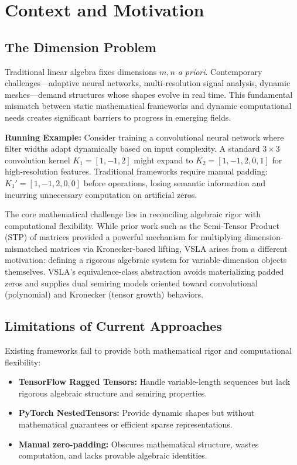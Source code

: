 \section{Context and Motivation}
\subsection{The Dimension Problem}
Traditional linear algebra fixes dimensions \(m,n\) \emph{a priori}.  Contemporary challenges—adaptive neural networks, multi‑resolution signal analysis, dynamic meshes—demand structures whose shapes evolve in real time. This fundamental mismatch between static mathematical frameworks and dynamic computational needs creates significant barriers to progress in emerging fields.

\vspace{0.5em}
\textbf{Running Example:} Consider training a convolutional neural network where filter widths adapt dynamically based on input complexity. A standard $3 \times 3$ convolution kernel $K_1 = [1, -1, 2]$ might expand to $K_2 = [1, -1, 2, 0, 1]$ for high-resolution features. Traditional frameworks require manual padding: $K_1' = [1, -1, 2, 0, 0]$ before operations, losing semantic information and incurring unnecessary computation on artificial zeros.

The core mathematical challenge lies in reconciling algebraic rigor with computational flexibility. While prior work such as the Semi-Tensor Product (STP) of matrices \cite{Cheng2001} provided a powerful mechanism for multiplying dimension-mismatched matrices via Kronecker-based lifting, VSLA arises from a different motivation: defining a rigorous algebraic system for variable-dimension objects themselves. VSLA's equivalence-class abstraction avoids materializing padded zeros and supplies dual semiring models oriented toward convolutional (polynomial) and Kronecker (tensor growth) behaviors.

\subsection{Limitations of Current Approaches}
\label{sec:limitations}

Existing frameworks fail to provide both mathematical rigor and computational flexibility:

\begin{itemize}[leftmargin=1.5em]
\item \textbf{TensorFlow Ragged Tensors:} Handle variable-length sequences but lack rigorous algebraic structure and semiring properties.
\item \textbf{PyTorch NestedTensors:} Provide dynamic shapes but without mathematical guarantees or efficient sparse representations.
\item \textbf{Manual zero-padding:} Obscures mathematical structure, wastes computation, and lacks provable algebraic identities.
\end{itemize}

